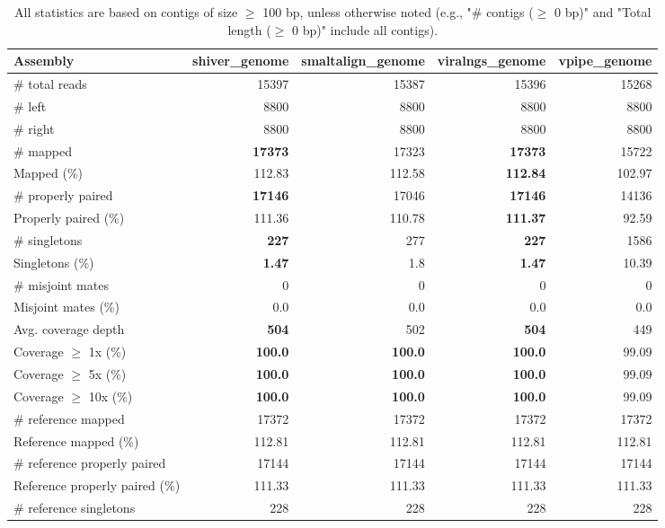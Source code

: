 \documentclass[12pt,a4paper]{article}
\begin{document}
\begin{table}[ht]
\begin{center}
\caption{All statistics are based on contigs of size $\geq$ 100 bp, unless otherwise noted (e.g., "\# contigs ($\geq$ 0 bp)" and "Total length ($\geq$ 0 bp)" include all contigs).}
\begin{tabular}{|l*{4}{|r}|}
\hline
Assembly & shiver\_genome & smaltalign\_genome & viralngs\_genome & vpipe\_genome \\ \hline
\# total reads & 15397 & 15387 & 15396 & 15268 \\ \hline
\# left & 8800 & 8800 & 8800 & 8800 \\ \hline
\# right & 8800 & 8800 & 8800 & 8800 \\ \hline
\# mapped & {\bf 17373} & 17323 & {\bf 17373} & 15722 \\ \hline
Mapped (\%) & 112.83 & 112.58 & {\bf 112.84} & 102.97 \\ \hline
\# properly paired & {\bf 17146} & 17046 & {\bf 17146} & 14136 \\ \hline
Properly paired (\%) & 111.36 & 110.78 & {\bf 111.37} & 92.59 \\ \hline
\# singletons & {\bf 227} & 277 & {\bf 227} & 1586 \\ \hline
Singletons (\%) & {\bf 1.47} & 1.8 & {\bf 1.47} & 10.39 \\ \hline
\# misjoint mates & 0 & 0 & 0 & 0 \\ \hline
Misjoint mates (\%) & 0.0 & 0.0 & 0.0 & 0.0 \\ \hline
Avg. coverage depth & {\bf 504} & 502 & {\bf 504} & 449 \\ \hline
Coverage $\geq$ 1x (\%) & {\bf 100.0} & {\bf 100.0} & {\bf 100.0} & 99.09 \\ \hline
Coverage $\geq$ 5x (\%) & {\bf 100.0} & {\bf 100.0} & {\bf 100.0} & 99.09 \\ \hline
Coverage $\geq$ 10x (\%) & {\bf 100.0} & {\bf 100.0} & {\bf 100.0} & 99.09 \\ \hline
\# reference mapped & 17372 & 17372 & 17372 & 17372 \\ \hline
Reference mapped (\%) & 112.81 & 112.81 & 112.81 & 112.81 \\ \hline
\# reference properly paired & 17144 & 17144 & 17144 & 17144 \\ \hline
Reference properly paired (\%) & 111.33 & 111.33 & 111.33 & 111.33 \\ \hline
\# reference singletons & 228 & 228 & 228 & 228 \\ \hline

\end{tabular}
\end{center}
\end{table}
\end{document}
